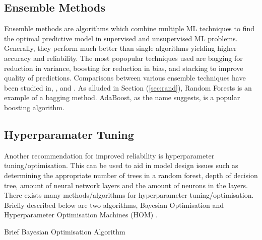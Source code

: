 \subsection{Ensemble Methods}
Ensemble methods are algorithms which combine multiple ML techniques to find the optimal predictive model in supervised and unsupervised ML problems.
Generally, they perform much better than single algorithms yielding higher accuracy and reliability.
The most popopular techniques used are bagging for reduction in variance, boosting for reduction in bias, and stacking to improve quality of predictions.
Comparisons between various ensemble techniques have been studied in, \cite{7340924}, \cite{8389056} and \cite{1358033}.
As alluded in Section (\ref{sec:rand}), Random Forests is an example of a bagging method. AdaBoost, as the name suggests, is a popular boosting algorithm.

\subsection{Hyperparamater Tuning}
Another recommendation for improved reliability is hyperparameter tuning/optimisation.
This can be used to aid in model design issues such as determining the appropriate number of trees in a random forest,
depth of decision tree, amount of neural network layers and the amount of neurons in the layers.
There exists many methods/algorithms for hyperparameter tuning/optimisation. 
Briefly described below are two algorithms, Bayesian Optimisation \cite{7900023} and Hyperparameter Optimisation Machines (HOM) \cite{7796889}.

\begin{algorithm}[H]
    \SetAlgoLined
    \caption{Brief Bayesian Optimisation Algorithm \cite{7900023}}
\end{algorithm}

